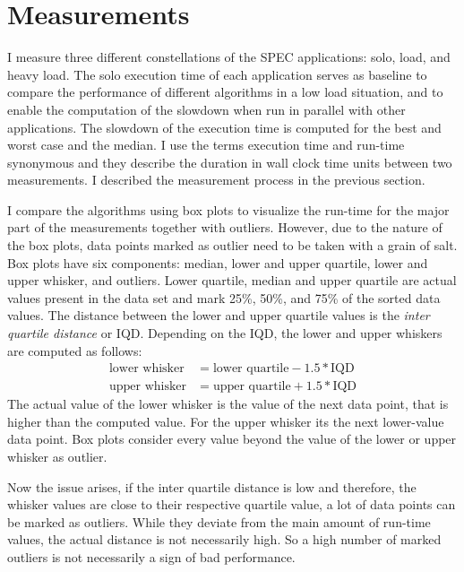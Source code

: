\section{Measurements}
\label{eval:measurements}

I measure three different constellations of the SPEC applications: solo, load,
and heavy load.
The solo execution time of each application serves as baseline to compare the
performance of different algorithms in a low load situation, and to enable the
computation of the slowdown when run in parallel with other applications.
The slowdown of the execution time is computed for the best and worst
case and the median.
I use the terms execution time and run-time synonymous and they describe the
duration in wall clock time units between two measurements.
I described the measurement process in the previous section.

I compare the algorithms using box plots to visualize
the run-time for the major part of the measurements together with outliers.
However, due to the nature of the box plots, data points marked as outlier need
to be taken with a grain of salt.
Box plots have six components: median, lower and upper quartile, lower and
upper whisker, and outliers.
Lower quartile, median and upper quartile are actual values present in the data
set and mark 25\%, 50\%, and 75\% of the sorted data values.
The distance between the lower and upper quartile values is the \emph{inter
quartile distance} or IQD.
Depending on the IQD, the lower and upper whiskers are computed as follows:
%
\begin{align*}
  \text{lower whisker} &= \text{lower quartile} - 1.5 * \text{IQD}\\
  \text{upper whisker} &= \text{upper quartile} + 1.5 * \text{IQD}
\end{align*}
%
The actual value of the lower whisker is the value of the next data point,
that is higher than the computed value.
For the upper whisker its the next lower-value data point.
Box plots consider every value beyond the value of the lower or upper whisker
as outlier.

Now the issue arises, if the inter quartile distance is low and therefore,
the whisker values are close to their respective quartile value, a lot of
data points can be marked as outliers.
While they deviate from the main amount of run-time values, the actual distance
is not necessarily high.
So a high number of marked outliers is not necessarily a sign of bad performance.

